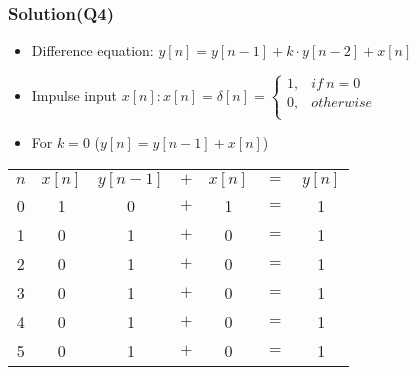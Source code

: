 \documentclass{beamer}
\begin{document}

\begin{frame}
\frametitle{Solution(Q4)}

\begin{itemize} \itemsep1pt \parskip0pt 
  \item[] Difference equation: $y[n] = y[n-1] + k \cdot y [n-2] + x[n]$
  \item[] Impulse input $x[n]:x[n]=\delta[n] =  \begin{cases}
                                                  1,& if ~n=0\\
                                                  0,& otherwise\\
                                                \end{cases}$
  \item[] For $k = 0$ ($y[n]=y[n-1]+x[n]$)
\end{itemize}

\begin{table}
\def\arraystretch{1.5}
\begin{tabular}{ccccccc}
\hline
$n$ & $x[n]$ & $y[n-1]$ & $+$ & $x[n]$ & $=$ & $y[n]$ \\

0 & 1 & 0 & $+$ & 1 & $=$ & 1 \\ 

1 & 0 & 1 & $+$ & 0 & $=$ & 1 \\ 

2 & 0 & 1 & $+$ & 0 & $=$ & 1 \\ 

3 & 0 & 1 & $+$ & 0 & $=$ & 1 \\ 

4 & 0 & 1 & $+$ & 0 & $=$ & 1 \\ 

5 & 0 & 1 & $+$ & 0 & $=$ & 1 \\ 
\hline
\end{tabular}
\end{table}


\end{frame}

\end{document}
